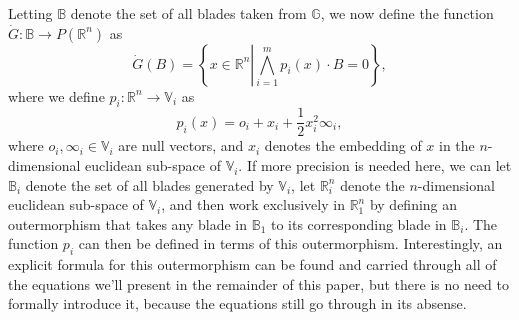\documentclass{ecgd-l}
\theoremstyle{definition}
\theoremstyle{remark}
\numberwithin{equation}{section}
\newcommand{\R}{\mathbb{R}}
\newcommand{\B}{\mathbb{B}}
\newcommand{\G}{\mathbb{G}}
\newcommand{\V}{\mathbb{V}}
\newcommand{\Gd}{\dot{G}}
\newcommand{\nvai}{\infty}
\newcommand{\nvao}{o}
\begin{document}
Letting $\B$ denote the set
of all blades taken from $\G$, we now define the function $\Gd:\B\to P(\R^n)$ as
\begin{equation}\label{equ_Gd}
\Gd(B) = \left\{x\in\R^n\left|\bigwedge_{i=1}^m p_i(x)\cdot B=0\right\}\right.,
\end{equation}
where we define $p_i:\R^n\to\V_i$ as
\begin{equation}\label{equ_p_i}
p_i(x) = \nvao_i + x_i + \frac{1}{2}x_i^2\nvai_i,
\end{equation}
where $\nvao_i,\nvai_i\in\V_i$ are null vectors, and $x_i$ denotes the embedding
of $x$ in the $n$-dimensional euclidean sub-space of $\V_i$.  If more precision is needed here,
we can let $\B_i$ denote the set of all blades generated by $\V_i$,
let $\R_i^n$ denote the $n$-dimensional euclidean sub-space of $\V_i$, and then
work exclusively in $\R_1^n$ by defining an outermorphism that takes any blade in $\B_1$
to its corresponding blade in $\B_i$.  The function $p_i$ can then be defined in terms
of this outermorphism.  Interestingly, an explicit formula for this outermorphism can be found and carried through
all of the equations we'll present in the remainder of this paper, but there is no need to
formally introduce it, because the equations still go through in its absense.
\end{document}
